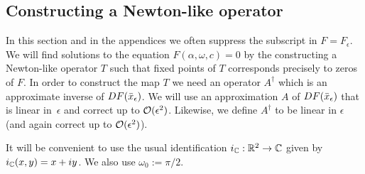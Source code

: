 
\subsection{Constructing a Newton-like operator}
\label{s:newtonlike}

In this section and in the appendices we often suppress the subscript in $F=F_\epsilon$.
We will find solutions to the equation $F(\alpha ,\omega , c)=0$ by the
constructing a Newton-like operator $T$ such that fixed points of $T$
corresponds precisely to zeros of $F$. In order to construct the map $T$ we
need an operator $A^{\dagger}$ which is an approximate inverse of 
$DF(\bar{x}_\epsilon)$. 
We will use an approximation $A$ of 
$DF( \bar{x}_\epsilon )$ that is linear in~$\epsilon$ and correct up to $\mathcal{O}(\epsilon^2)$.
Likewise, we define $A^{\dagger}$ to be linear in $\epsilon$ (and again correct up to $\mathcal{O}(\epsilon^2)$). 

It will be convenient to use the usual identification $i_{\mathbb{C}} : \mathbb{R}^2 \to \mathbb{C}$ given by $i_{\mathbb{C}} (x,y) = x+iy $. We also use $\omega_0 := \pi/2$.

